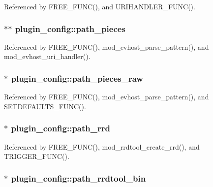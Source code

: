 Referenced by F\-R\-E\-E\-\_\-\-F\-U\-N\-C(), and U\-R\-I\-H\-A\-N\-D\-L\-E\-R\-\_\-\-F\-U\-N\-C().

\hypertarget{structplugin__config_ad893918703f5468a3237aed674073194}{
\subsubsection[{path\-\_\-pieces}]{$\ast$$\ast$ plugin\-\_\-config\-::path\-\_\-pieces}}\label{structplugin__config_ad893918703f5468a3237aed674073194}


Referenced by F\-R\-E\-E\-\_\-\-F\-U\-N\-C(), mod\-\_\-evhost\-\_\-parse\-\_\-pattern(), and mod\-\_\-evhost\-\_\-uri\-\_\-handler().

\hypertarget{structplugin__config_aec0e007f1d17359a43373ec7103255a5}{
\subsubsection[{path\-\_\-pieces\-\_\-raw}]{$\ast$ plugin\-\_\-config\-::path\-\_\-pieces\-\_\-raw}}\label{structplugin__config_aec0e007f1d17359a43373ec7103255a5}


Referenced by F\-R\-E\-E\-\_\-\-F\-U\-N\-C(), mod\-\_\-evhost\-\_\-parse\-\_\-pattern(), and S\-E\-T\-D\-E\-F\-A\-U\-L\-T\-S\-\_\-\-F\-U\-N\-C().

\hypertarget{structplugin__config_a2c786a61295bfbae1e70c44aa2d25b5d}{
\subsubsection[{path\-\_\-rrd}]{$\ast$ plugin\-\_\-config\-::path\-\_\-rrd}}\label{structplugin__config_a2c786a61295bfbae1e70c44aa2d25b5d}


Referenced by F\-R\-E\-E\-\_\-\-F\-U\-N\-C(), mod\-\_\-rrdtool\-\_\-create\-\_\-rrd(), and T\-R\-I\-G\-G\-E\-R\-\_\-\-F\-U\-N\-C().

\hypertarget{structplugin__config_ac7180097e35afa33527e0559de42634f}{
\subsubsection[{path\-\_\-rrdtool\-\_\-bin}]{$\ast$ plugin\-\_\-config\-::path\-\_\-rrdtool\-\_\-bin}}\label{structplugin__config_ac7180097e35afa33527e0559de42634f}


